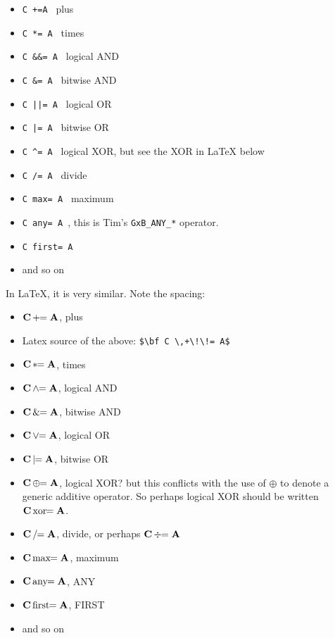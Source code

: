 \documentclass[11pt]{article}
\begin{document}
    \begin{itemize}
    \item[] \verb'C +=A ' plus
    \item[] \verb'C *= A ' times
    \item[] \verb'C &&= A ' logical AND
    \item[] \verb'C &= A ' bitwise AND
    \item[] \verb'C ||= A ' logical OR
    \item[] \verb'C |= A ' bitwise OR
    \item[] \verb'C ^= A ' logical XOR, but see the XOR in LaTeX below
    \item[] \verb'C /= A ' divide
    \item[] \verb'C max= A ' maximum
    \item[] \verb'C any= A ', this is Tim's \verb'GxB_ANY_*' operator.
    \item[] \verb'C first= A '
    \item[] and so on
    \end{itemize}

In LaTeX, it is very similar.  Note the spacing:

    \begin{itemize}
    \item[] $\bf C \,+\!\!= A $, plus
    \item[] Latex source of the above: \verb'$\bf C \,+\!\!= A$'
    \item[] $\bf C \,*\!\!= A $, times
    \item[] $\bf C \,\wedge\!\!= A $, logical AND
    \item[] $\bf C \,\&\!\!= A $, bitwise AND
    \item[] $\bf C \,\vee\!\!= A $, logical OR
    \item[] $\bf C \,|\!\!= A $, bitwise OR
    \item[] $\bf C \,\oplus\!\!= A $, logical XOR?  but this conflicts with
        the use of $\oplus$ to denote a generic additive operator.
        So perhaps logical XOR should be written
        $\bf C \,\mbox{xor}\!\!= A $.
    \item[] $\bf C \,/\!\!= A $, divide, or perhaps
        $\bf C \,\div\!\!= A $
    \item[] $\bf C \,\mbox{max}\!\!= A $, maximum
    \item[] $\bf C \,\mbox{any}\!\!= A $, ANY
    \item[] $\bf C \,\mbox{first}\!\!= A $, FIRST
    \item[] and so on
    \end{itemize}
\end{document}
